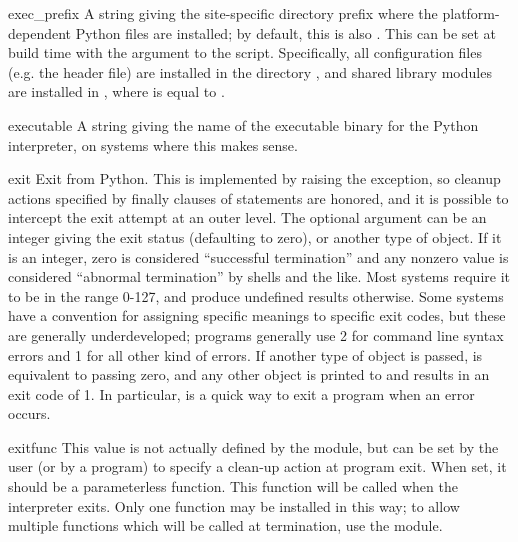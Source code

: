 \begin{datadesc}{exec_prefix}
  A string giving the site-specific directory prefix where the
  platform-dependent Python files are installed; by default, this is
  also .  This can be set at build time with the
   argument to the 
  script.  Specifically, all configuration files (e.g. the
   header file) are installed in the directory
  , and shared
  library modules are installed in , where  is
  equal to .
\end{datadesc}

\begin{datadesc}{executable}
  A string giving the name of the executable binary for the Python
  interpreter, on systems where this makes sense.
\end{datadesc}

\begin{funcdesc}{exit}{}
  Exit from Python.  This is implemented by raising the
   exception, so cleanup actions specified by
  finally clauses of  statements are honored, and it is
  possible to intercept the exit attempt at an outer level.  The
  optional argument  can be an integer giving the exit status
  (defaulting to zero), or another type of object.  If it is an
  integer, zero is considered ``successful termination'' and any
  nonzero value is considered ``abnormal termination'' by shells and
  the like.  Most systems require it to be in the range 0-127, and
  produce undefined results otherwise.  Some systems have a convention
  for assigning specific meanings to specific exit codes, but these
  are generally underdeveloped; \UNIX{} programs generally use 2 for
  command line syntax errors and 1 for all other kind of errors.  If
  another type of object is passed,  is equivalent to
  passing zero, and any other object is printed to 
  and results in an exit code of 1.  In particular,
   is a quick way to exit a
  program when an error occurs.
\end{funcdesc}

\begin{datadesc}{exitfunc}
  This value is not actually defined by the module, but can be set by
  the user (or by a program) to specify a clean-up action at program
  exit.  When set, it should be a parameterless function.  This
  function will be called when the interpreter exits.  Only one
  function may be installed in this way; to allow multiple functions
  which will be called at termination, use the 
  module.  
\end{datadesc}

